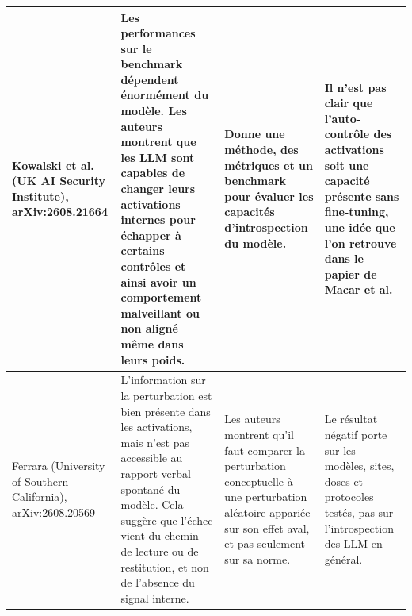 \documentclass[10pt,a4paper]{article}
\begin{document}
\begin{landscape}
\begin{longtable}{@{}L{4.5cm} L{7.2cm} L{6.3cm} L{6.3cm}@{}}
Kowalski et al. \cite{kowalski2026}
  \newline (UK AI Security Institute), arXiv:2608.21664
& Les performances sur le benchmark dépendent énormément du modèle. Les auteurs montrent que les LLM sont capables de changer leurs activations internes pour échapper à certains contrôles et ainsi avoir un comportement malveillant ou non aligné même dans leurs poids.
& Donne une méthode, des métriques et un benchmark pour évaluer les capacités d'introspection du modèle.
& Il n'est pas clair que l'auto-contrôle des activations soit une capacité présente sans fine-tuning, une idée que l'on retrouve dans le papier de Macar et al.
\\
\midrule

Ferrara \cite{ferrara2026}
  \newline (University of Southern California), arXiv:2608.20569
& L'information sur la perturbation est bien présente dans les activations, mais n'est pas accessible au rapport verbal spontané du modèle. Cela suggère que l'échec vient du chemin de lecture ou de restitution, et non de l'absence du signal interne.
& Les auteurs montrent qu'il faut comparer la perturbation conceptuelle à une perturbation aléatoire appariée sur son effet aval, et pas seulement sur sa norme.
& Le résultat négatif porte sur les modèles, sites, doses et protocoles testés, pas sur l'introspection des LLM en général.
\\
\end{longtable}
\end{landscape}
\restoregeometry
\end{document}
